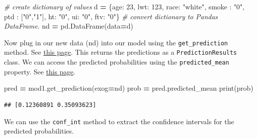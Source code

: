 \documentclass[
]{book}
\newenvironment{Shaded}{\begin{snugshade}}{\end{snugshade}}
\newcommand{\BuiltInTok}[1]{#1}
\newcommand{\CommentTok}[1]{\textcolor[rgb]{0.56,0.35,0.01}{\textit{#1}}}
\newcommand{\DecValTok}[1]{\textcolor[rgb]{0.00,0.00,0.81}{#1}}
\newcommand{\NormalTok}[1]{#1}
\newcommand{\OperatorTok}[1]{\textcolor[rgb]{0.81,0.36,0.00}{\textbf{#1}}}
\newcommand{\StringTok}[1]{\textcolor[rgb]{0.31,0.60,0.02}{#1}}
\begin{document}
\begin{Shaded}
\begin{Highlighting}[]
\CommentTok{\# create dictionary of values}
\NormalTok{d }\OperatorTok{=}\NormalTok{ \{}\StringTok{\textquotesingle{}age\textquotesingle{}}\NormalTok{: }\DecValTok{23}\NormalTok{, }\StringTok{\textquotesingle{}lwt\textquotesingle{}}\NormalTok{: }\DecValTok{123}\NormalTok{, }\StringTok{\textquotesingle{}race\textquotesingle{}}\NormalTok{: }\StringTok{"white"}\NormalTok{,}
     \StringTok{\textquotesingle{}smoke\textquotesingle{}}\NormalTok{ : }\StringTok{"0"}\NormalTok{, }\StringTok{\textquotesingle{}ptd\textquotesingle{}}\NormalTok{ : [}\StringTok{"0"}\NormalTok{,}\StringTok{"1"}\NormalTok{], }\StringTok{\textquotesingle{}ht\textquotesingle{}}\NormalTok{: }\StringTok{"0"}\NormalTok{, }
     \StringTok{\textquotesingle{}ui\textquotesingle{}}\NormalTok{: }\StringTok{"0"}\NormalTok{, }\StringTok{\textquotesingle{}ftv\textquotesingle{}}\NormalTok{: }\StringTok{"0"}\NormalTok{\}}
\CommentTok{\# convert dictionary to Pandas DataFrame.}
\NormalTok{nd }\OperatorTok{=}\NormalTok{ pd.DataFrame(data}\OperatorTok{=}\NormalTok{d)}
\end{Highlighting}
\end{Shaded}

Now plug in our new data (nd) into our model using the \texttt{get\_prediction} method. See \href{https://www.statsmodels.org/devel/generated/statsmodels.genmod.generalized_linear_model.GLMResults.html\#statsmodels.genmod.generalized_linear_model.GLMResults}{this page}. This returns the predictions as a \texttt{PredictionResults} class. We can access the predicted probabilities using the \texttt{predicted\_mean} property. See \href{https://www.statsmodels.org/devel/generated/statsmodels.tsa.base.prediction.PredictionResults.html}{this page}.

\begin{Shaded}
\begin{Highlighting}[]
\NormalTok{pred }\OperatorTok{=}\NormalTok{ mod1.get\_prediction(exog}\OperatorTok{=}\NormalTok{nd)}
\NormalTok{prob }\OperatorTok{=}\NormalTok{ pred.predicted\_mean}
\BuiltInTok{print}\NormalTok{(prob)}
\end{Highlighting}
\end{Shaded}

\begin{verbatim}
## [0.12360891 0.35093623]
\end{verbatim}

We can use the \texttt{conf\_int} method to extract the confidence intervals for the predicted probabilities.
\end{document}
